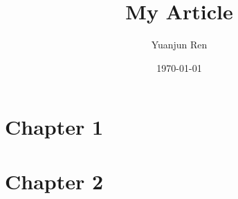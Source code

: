 \documentclass[11pt]{article}
\title{My Article}
\author{Yuanjun Ren}
\date{\today}
\begin{document}
\maketitle

\newpage

\tableofcontents
\newpage

\section{Chapter 1}

\section{Chapter 2}


\end{document}
